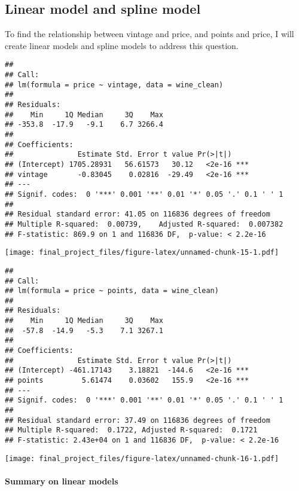 \documentclass[
]{article}
\begin{document}
\hypertarget{linear-model-and-spline-model}{%
\subsection{Linear model and spline
model}\label{linear-model-and-spline-model}}

To find the relationship between vintage and price, and points and
price, I will create linear models and spline models to address this
question.

\begin{verbatim}
## 
## Call:
## lm(formula = price ~ vintage, data = wine_clean)
## 
## Residuals:
##    Min     1Q Median     3Q    Max 
## -353.8  -17.9   -9.1    6.7 3266.4 
## 
## Coefficients:
##               Estimate Std. Error t value Pr(>|t|)    
## (Intercept) 1705.28931   56.61573   30.12   <2e-16 ***
## vintage       -0.83045    0.02816  -29.49   <2e-16 ***
## ---
## Signif. codes:  0 '***' 0.001 '**' 0.01 '*' 0.05 '.' 0.1 ' ' 1
## 
## Residual standard error: 41.05 on 116836 degrees of freedom
## Multiple R-squared:  0.00739,    Adjusted R-squared:  0.007382 
## F-statistic: 869.9 on 1 and 116836 DF,  p-value: < 2.2e-16
\end{verbatim}

\texttt{[image: final\_project\_files/figure-latex/unnamed-chunk-15-1.pdf]}

\begin{verbatim}
## 
## Call:
## lm(formula = price ~ points, data = wine_clean)
## 
## Residuals:
##    Min     1Q Median     3Q    Max 
##  -57.8  -14.9   -5.3    7.1 3267.1 
## 
## Coefficients:
##               Estimate Std. Error t value Pr(>|t|)    
## (Intercept) -461.17143    3.18821  -144.6   <2e-16 ***
## points         5.61474    0.03602   155.9   <2e-16 ***
## ---
## Signif. codes:  0 '***' 0.001 '**' 0.01 '*' 0.05 '.' 0.1 ' ' 1
## 
## Residual standard error: 37.49 on 116836 degrees of freedom
## Multiple R-squared:  0.1722, Adjusted R-squared:  0.1721 
## F-statistic: 2.43e+04 on 1 and 116836 DF,  p-value: < 2.2e-16
\end{verbatim}

\texttt{[image: final\_project\_files/figure-latex/unnamed-chunk-16-1.pdf]}

\hypertarget{summary-on-linear-models}{%
\paragraph{Summary on linear models}\label{summary-on-linear-models}}
\end{document}
